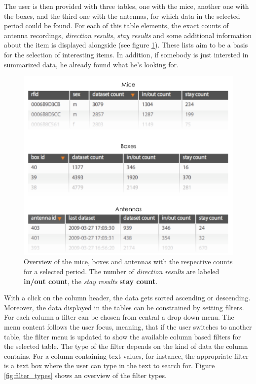 The user is then provided with three tables, one with the mice, another one with the boxes, and the third one with the antennas, for which data in the selected period could be found. For each of this table elements, the exact counts of antenna recordings, \textit{direction results}, \textit{stay results} and some additional information about the item is displayed alongside (see figure \ref{fig:data_overview_with_count}). These lists aim to be a basis for the selection of interesting items. In addition, if somebody is just intersted in summarized data, he already found what he's looking for. 

\begin{figure}[htpb]
\begin{center}
  \includegraphics[width=.75\textwidth]{assets/pdf/overview_list.pdf}
  \caption[Overview of the summarized data for mice, boxes and antennas within a date period]{Overview of the mice, boxes and antennas with the respective counts for a selected period. The number of \textit{direction results} are labeled \textbf{in/out count}, the \textit{stay results}  \textbf{stay count}.}
  \label{fig:data_overview_with_count}
\end{center}
\end{figure}

With a click on the column header, the data gets sorted ascending or descending. Moreover, the data displayed in the tables can be constrained by setting filters. For each column a filter can be chosen from central a drop down menu. The menu content follows the user focus, meaning, that if the user switches to another table, the filter menu is updated to show the available column based filters for the selected table. The type of the filter depends on the kind of data the column contains. For a column containing text values, for instance, the appropriate filter is a text box where the user can type in the text to search for. Figure \ref{fig:filter_types} shows an overview of the filter types.

